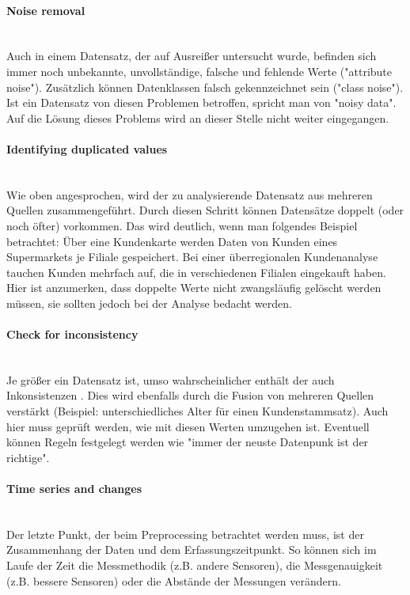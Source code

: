 \paragraph{Noise removal}\mbox{} \\
Auch in einem Datensatz, der auf Ausreißer untersucht wurde, befinden sich immer noch unbekannte, unvollständige, falsche und fehlende Werte ("attribute noise"). Zusätzlich können Datenklassen falsch gekennzeichnet sein ("class noise"). Ist ein Datensatz von diesen Problemen betroffen, spricht man von "noisy data". Auf die Lösung dieses Problems wird an dieser Stelle nicht weiter eingegangen. 

\paragraph{Identifying duplicated values}\mbox{} \\
Wie oben angesprochen, wird der zu analysierende Datensatz aus mehreren Quellen zusammengeführt. Durch diesen Schritt können Datensätze doppelt (oder noch öfter) vorkommen. Das wird deutlich, wenn man folgendes Beispiel betrachtet: \newline
Über eine Kundenkarte werden Daten von Kunden eines Supermarkets je Filiale gespeichert. Bei einer überregionalen Kundenanalyse tauchen Kunden mehrfach auf, die in verschiedenen Filialen eingekauft haben. Hier ist anzumerken, dass doppelte Werte nicht zwangsläufig gelöscht werden müssen, sie sollten jedoch bei der Analyse bedacht werden.

\paragraph{Check for inconsistency}\mbox{} \\
Je größer ein Datensatz ist, umso wahrscheinlicher enthält der auch Inkonsistenzen . Dies wird ebenfalls durch die Fusion von mehreren Quellen verstärkt (Beispiel: unterschiedliches Alter für einen Kundenstammsatz). Auch hier muss geprüft werden, wie mit diesen Werten umzugehen ist. Eventuell können Regeln festgelegt werden wie "immer der neuste Datenpunk ist der richtige".

\paragraph{Time series and changes}\mbox{} \\
Der letzte Punkt, der beim Preprocessing betrachtet werden muss, ist der Zusammenhang der Daten und dem Erfassungszeitpunkt. So können sich im Laufe der Zeit die Messmethodik (z.B. andere Sensoren), die Messgenauigkeit (z.B. bessere Sensoren) oder die Abstände der Messungen verändern. 

